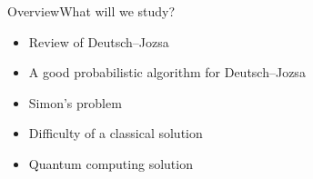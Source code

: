 
\begin{frame}{Overview}{What will we study?}

\begin{itemize}
    \item Review of Deutsch--Jozsa
    \item A good probabilistic algorithm for Deutsch--Jozsa
    \item Simon's problem
    \item Difficulty of a classical solution
    \item Quantum computing solution
\end{itemize}

\end{frame}

